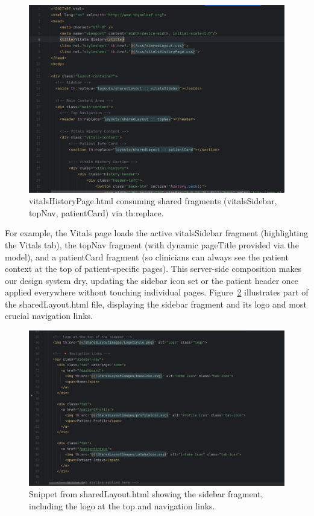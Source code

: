 \begin{figure}[H]
  \centering
  \includegraphics[width=0.8\linewidth]{images03/3-2-2-vitalHS.png} 
  \caption{vitalsHistoryPage.html consuming shared fragments (vitalsSidebar, topNav, patientCard) via th:replace.}
  \label{fig:3-2-2-vital-history-page}
\end{figure}

For example, the Vitals page loads the active vitalsSidebar fragment (highlighting the Vitals tab), the topNav fragment (with dynamic pageTitle provided via the model), and a patientCard fragment (so clinicians can always see the patient context at the top of patient-specific pages). This server-side composition makes our design system dry, updating the sidebar icon set or the patient header once applied everywhere without touching individual pages. Figure~\ref{fig:3-2-2-sharedLayout} illustrates part of the sharedLayout.html file, displaying the sidebar fragment and its logo and most crucial navigation links.

\begin{figure}[H]
  \centering
  \includegraphics[width=0.8\linewidth]{images03/3-2-2-sharedLayout.png} 
  \caption{Snippet from sharedLayout.html showing the sidebar fragment, including the logo at the top and navigation links.}
  \label{fig:3-2-2-sharedLayout}
\end{figure}

